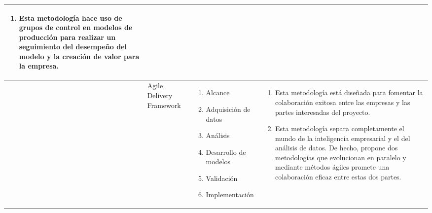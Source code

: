 \begin{table*}
\begin{threeparttable}
\begin{tabular}{ p{2cm} p{4cm} p{5cm} p{6cm}  }
\begin{enumerate}
				\item Esta metodología hace uso de grupos de control en modelos de producción para realizar un seguimiento del desempeño del modelo y la creación de valor para la empresa.
			\end{enumerate}
			\\ \hline
			\citep{Larson2016}
			&Agile Delivery Framework
			&  \begin{enumerate}
				\item Alcance
				\item Adquisición de datos
				\item Análisis
				\item Desarrollo de modelos
				\item Validación
				\item Implementación 
			\end{enumerate}
			& \begin{enumerate}
				\item Esta metodología está diseñada para fomentar la colaboración exitosa entre las empresas y las partes interesadas del proyecto.
				\item Esta metodología separa completamente el mundo de la inteligencia empresarial y el del análisis de datos. De hecho, propone dos metodologías que evolucionan en paralelo y mediante métodos ágiles promete una colaboración eficaz entre estas dos partes.
			\end{enumerate}
			
		\end{tabular}
	\end{threeparttable}
\end{table*}

